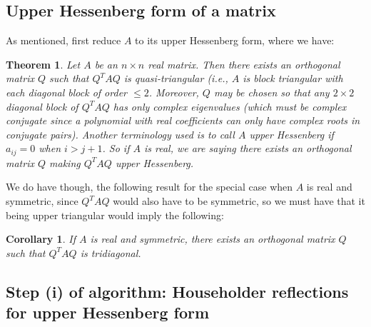 \documentclass[11.5pt]{article}
\newtheorem{theorem}{Theorem}
\newtheorem{corollary}{Corollary}
\theoremstyle{definition}
\begin{document}
\subsection{Upper Hessenberg form of a matrix}
As mentioned, first reduce $A$ to its upper Hessenberg form, where we have:
\begin{theorem}
Let $A$ be an $n\times n$ real matrix. Then there exists an orthogonal matrix $Q$ such that $Q^TAQ$ is quasi-triangular (i.e., $A$ is block triangular with each diagonal block of order $\leq 2$. Moreover, $Q$ may be chosen so that any $2\times 2$ diagonal block of $Q^TAQ$ has only complex eigenvalues (which must be complex conjugate since a polynomial with real coefficients can only have complex roots in conjugate pairs). Another terminology used is to call $A$ upper Hessenberg if $a_{ij}=0$ when $i>j+1$. So if $A$ is real, we are saying there exists an orthogonal matrix $Q$ making $Q^TAQ$ upper Hessenberg.
\end{theorem}


We do have though, the following result for the special case when $A$ is real and symmetric, since $Q^TAQ$ would also have to be symmetric, so we must have that it being upper triangular would imply the following: 
\begin{corollary}
If $A$ is real and symmetric, there exists an orthogonal matrix $Q$ such that $Q^TAQ$ is tridiagonal.
\end{corollary}

\subsection{Step (i) of algorithm: Householder reflections for upper Hessenberg form}
\end{document}
